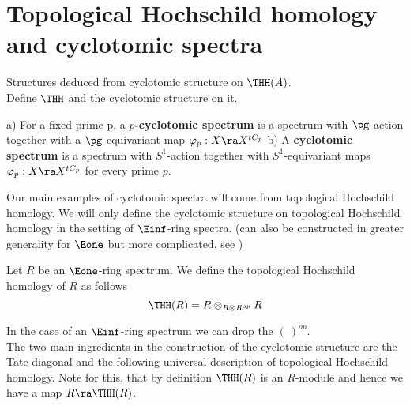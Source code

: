 \chapter{Topological Hochschild homology and cyclotomic spectra}
Structures deduced from cyclotomic structure on $\THH(A)$.
\\
Define $\THH$ and the cyclotomic structure on it. 


\begin{defn}\cite[Chapter~2.1]{NS}
a) For a fixed prime p, a \textbf{$p$-cyclotomic spectrum} is a spectrum with $\pg$-action together with a $\pg$-equivariant map $\varphi_p: X \ra X^{tC_p}$ \newline
b) A \textbf{cyclotomic spectrum} is a spectrum with $S^1$-action together with  $S^1$-equivariant maps $\varphi_p: X \ra X^{tC_p}$ for every prime $p$.
\end{defn}

Our main examples of cyclotomic spectra will come from topological Hochschild homology.
We will only define the cyclotomic structure on topological Hochschild homology in the setting of $\Einf$-ring spectra. (can also be constructed in greater generality for $\Eone$ but more complicated, see \cite[Chapter~3.1]{NS})
\begin{defn}
Let $R$ be an $\Eone$-ring spectrum.
We define the topological Hochschild homology of $R$ as follows
\begin{equation*}
    \THH(R)=R\otimes_{R\otimes R^{op}}R
\end{equation*}
\end{defn}
In the case of an $\Einf$-ring spectrum we can drop the $(\:)^{op}$. \\
The two main ingredients in the construction of the cyclotomic structure are the Tate diagonal and the following universal description of topological Hochschild homology. Note for this, that by definition $\THH(R)$ is an $R$-module and hence we have a map $R\ra\THH(R)$.

